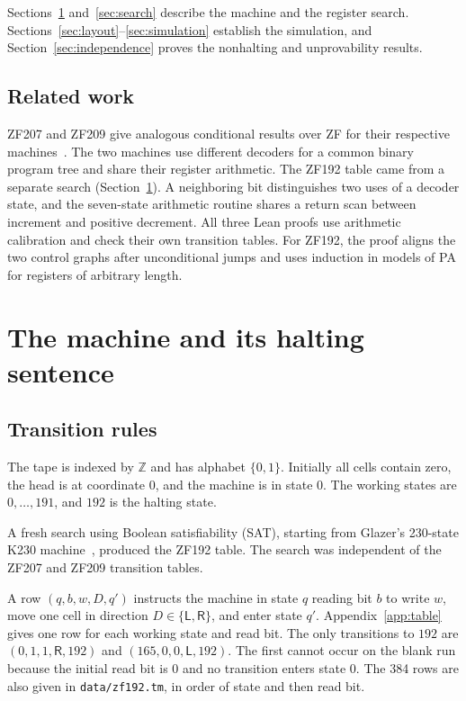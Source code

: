 \documentclass[11pt,letterpaper]{article}
\newcommand{\file}[1]{\nolinkurl{#1}}
\newcommand{\Left}{\mathsf{L}}
\newcommand{\Right}{\mathsf{R}}
\begin{document}
Sections~\ref{sec:machine} and~\ref{sec:search} describe the machine
and the register search. Sections~\ref{sec:layout}--\ref{sec:simulation}
establish the simulation, and Section~\ref{sec:independence} proves
the nonhalting and unprovability results.

\subsection{Related work}

ZF207 and ZF209 give analogous conditional results over ZF for
their respective machines~\cite{zf207,zf209}. The two machines use
different decoders for a common binary program tree and share their
register arithmetic. The ZF192 table came from a separate search
(Section~\ref{sec:machine}). A neighboring bit distinguishes two
uses of a decoder state, and the seven-state arithmetic routine
shares a return scan between increment and positive decrement.
All three Lean proofs use arithmetic calibration and check their
own transition tables. For ZF192, the proof aligns the two control
graphs after unconditional jumps and uses induction in models of PA
for registers of arbitrary length.

\section{The machine and its halting sentence}\label{sec:machine}

\subsection{Transition rules}

The tape is indexed by $\mathbb{Z}$ and has alphabet $\{0,1\}$.
Initially all cells contain zero, the head is at coordinate $0$,
and the machine is in state $0$. The working states are
$0,\ldots,191$, and $192$ is the halting state.

A fresh search using Boolean satisfiability (SAT),
starting from Glazer's 230-state K230 machine~\cite{k230},
produced the ZF192 table. The search was independent of the ZF207 and ZF209
transition tables.

A row $(q,b,w,D,q')$ instructs the machine in state $q$ reading bit
$b$ to write $w$, move one cell in direction $D\in\{\Left,\Right\}$,
and enter state $q'$. Appendix~\ref{app:table} gives one row for
each working state and read bit. The only transitions to $192$
are $(0,1,1,\Right,192)$ and $(165,0,0,\Left,192)$. The first
cannot occur on the blank run because the initial read bit is $0$
and no transition enters state $0$. The 384 rows are also given in
\file{data/zf192.tm}, in order of state and then read bit.
\end{document}
